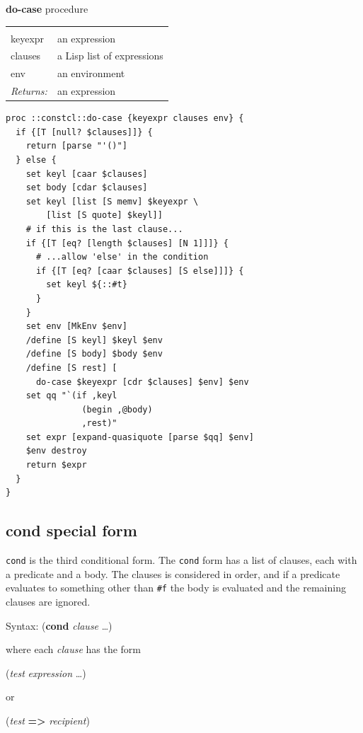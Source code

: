 \documentclass[twoside]{report}
\begin{document}
\textbf{do-case} procedure

\noindent\begin{tabular}{ |p{1.9cm} p{8cm}| }
\hline
\rowcolor[HTML]{CCCCCC} \multicolumn{2}{|l|}{\bf do-case (internal)} \\
keyexpr & an expression \\
clauses & a Lisp list of expressions \\
env & an environment \\
\textit{Returns:} & an expression \\
\hline
\end{tabular}

\begin{lstlisting}
proc ::constcl::do-case {keyexpr clauses env} {
  if {[T [null? $clauses]]} {
    return [parse "'()"]
  } else {
    set keyl [caar $clauses]
    set body [cdar $clauses]
    set keyl [list [S memv] $keyexpr \
        [list [S quote] $keyl]]
    # if this is the last clause...
    if {[T [eq? [length $clauses] [N 1]]]} {
      # ...allow 'else' in the condition
      if {[T [eq? [caar $clauses] [S else]]]} {
        set keyl ${::#t}
      }
    }
    set env [MkEnv $env]
    /define [S keyl] $keyl $env
    /define [S body] $body $env
    /define [S rest] [
      do-case $keyexpr [cdr $clauses] $env] $env
    set qq "`(if ,keyl
               (begin ,@body)
               ,rest)"
    set expr [expand-quasiquote [parse $qq] $env]
    $env destroy
    return $expr
  }
}
\end{lstlisting}

\subsection{cond special form}
\label{cond-special-form}

\texttt{cond} is the third conditional form. The \texttt{cond} form has a list of clauses, each with a predicate and a body. The clauses is considered in order, and if a predicate evaluates to something other than \texttt{\#f} the body is evaluated and the remaining clauses are ignored.

Syntax: (\textbf{cond} \emph{clause} \ldots )

where each \emph{clause} has the form

(\emph{test} \emph{expression} \ldots )

or

(\emph{test} \textbf{=>} \emph{recipient})
\end{document}
